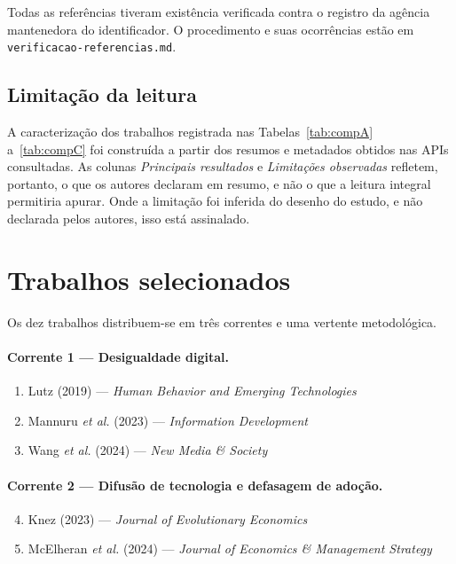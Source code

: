 \documentclass[12pt,a4paper]{article}
\begin{document}
\begin{sloppypar}
Todas as referências tiveram existência verificada contra o registro da agência
mantenedora do identificador. O procedimento e suas ocorrências estão em
\texttt{verificacao-referencias.md}.
\end{sloppypar}

\subsection{Limitação da leitura}

A caracterização dos trabalhos registrada nas Tabelas~\ref{tab:compA} a~\ref{tab:compC} foi
construída a partir dos resumos e metadados obtidos nas APIs consultadas. As colunas
\emph{Principais resultados} e \emph{Limitações observadas} refletem, portanto, o que
os autores declaram em resumo, e não o que a leitura integral permitiria apurar. Onde
a limitação foi inferida do desenho do estudo, e não declarada pelos autores, isso
está assinalado.

\section{Trabalhos selecionados}

Os dez trabalhos distribuem-se em três correntes e uma vertente metodológica.

\paragraph{Corrente 1 --- Desigualdade digital.}
\begin{enumerate}
  \item Lutz (2019) --- \emph{Human Behavior and Emerging Technologies}
  \item Mannuru \textit{et al.} (2023) --- \emph{Information Development}
  \item Wang \textit{et al.} (2024) --- \emph{New Media \& Society}
\end{enumerate}

\paragraph{Corrente 2 --- Difusão de tecnologia e defasagem de adoção.}
\begin{enumerate}\setcounter{enumi}{3}
  \item Knez (2023) --- \emph{Journal of Evolutionary Economics}
  \item McElheran \textit{et al.} (2024) --- \emph{Journal of Economics \& Management Strategy}
\end{enumerate}
\end{document}
